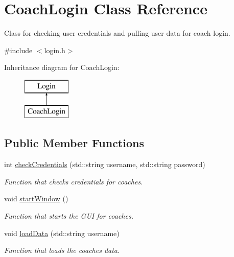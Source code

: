 \hypertarget{classCoachLogin}{}\section{Coach\+Login Class Reference}
\label{classCoachLogin}


Class for checking user credentials and pulling user data for coach login.  




{\ttfamily \#include $<$login.\+h$>$}

Inheritance diagram for Coach\+Login\+:\begin{figure}[H]
\begin{center}
\leavevmode
\includegraphics[height=2.000000cm]{classCoachLogin}
\end{center}
\end{figure}
\subsection*{Public Member Functions}
\begin{DoxyCompactItemize}
\item 
int \mbox{\hyperlink{classCoachLogin_a68ad4e904820d7a95d842e159fbc9edc}{check\+Credentials}} (std\+::string username, std\+::string password)
\begin{DoxyCompactList}\small\item\em Function that checks credentials for coaches. \end{DoxyCompactList}\item 
void \mbox{\hyperlink{classCoachLogin_ab6357836d5e7cb4b82bca85a1f5c67a0}{start\+Window}} ()
\begin{DoxyCompactList}\small\item\em Function that starts the G\+UI for coaches. \end{DoxyCompactList}\item 
void \mbox{\hyperlink{classCoachLogin_a7b4a4bc451520e54bdba247204dd072d}{load\+Data}} (std\+::string username)
\begin{DoxyCompactList}\small\item\em Function that loads the coaches data. \end{DoxyCompactList}\end{DoxyCompactItemize}
